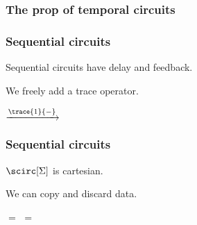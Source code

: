 \begin{frame}
    \frametitle{The prop of temporal circuits}
    
    \begin{center}
    \end{center}

\end{frame}
\begin{frame}
    \frametitle{Sequential circuits}

    \pause

    Sequential circuits have delay and \alert{feedback}.
    
    \pause

    We freely add a \alert{trace operator}.

    \pause

    \begin{center}
        \quad\(\xrightarrow{\trace{1}{-}}\)\quad
    \end{center}        

    \pause

    \vspace{1.5em}

    \begin{center}
    \end{center}

\end{frame}
\begin{frame}
    \frametitle{Sequential circuits}

    \pause

    \begin{theorem}
        \(\scirc[\Sigma]\) is cartesian.
    \end{theorem}
    \pause
    We can \alert{copy} and \alert{discard} data.
    \pause
    \begin{center}
        \pause
        \quad\(=\)\quad
        \quad\quad
        \pause
        \pause
        \quad\(=\)\quad
    \end{center}

\end{frame}

